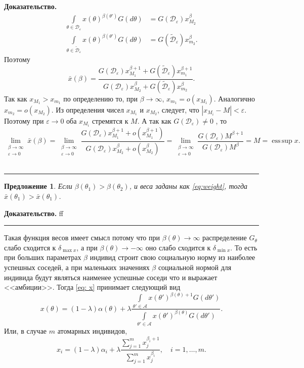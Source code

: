 \documentclass[12pt]{article}
\newtheorem{proposition}{Предложение}
\newenvironment{proof}[1][Доказательство]{\noindent\textbf{#1.} }{\ \rule{0.5em}{0.5em}}
\newcommand\abs[1]{\left\lvert#1\right\rvert}
\DeclareMathOperator*{\esssup}{ess\,sup}
\begin{document}
\begin{proof}
\begin{align*}
\int\limits_{\theta \in \mathcal{D}_\varepsilon}x(\theta)^{\beta(\theta')}G(d \theta) &= G(\mathcal{D}_\varepsilon) x_{M_2}^{\beta}  \\
\int\limits_{\theta \in \widetilde{\mathcal{D}}_\varepsilon}x(\theta)^{\beta(\theta')}G(d \theta) &= G(\widetilde{\mathcal{D}}_\varepsilon) x_{m_2}^{\beta}.
\end{align*}
Поэтому 
\begin{equation*}
\bar{x}(\beta) = \frac{G(\mathcal{D}_\varepsilon) x_{M_1}^{\beta + 1} + G(\widetilde{\mathcal{D}}_\varepsilon) x_{m_1}^{\beta+1}}{G(\mathcal{D}_\varepsilon) x_{M_2}^{\beta} + G(\widetilde{\mathcal{D}}_\varepsilon) x_{m_2}^{\beta}}.
\end{equation*}
Так как $x_{M_1} > x_{m_1}$ по определению то,  при $\beta \to \infty$,  $x_{m_1} = o(x_{M_1}). $ 
Аналогично $x_{m_2} = o(x_{M_2}). $ 
Из определения чисел $x_{M_1}$ и $x_{M_2}$,  следует,  что $\abs{x_{M_i} - M} < \varepsilon$.  Поэтому при $\varepsilon \to 0$ оба $x_{M_i}$ стремятся к $M$. 
А так как $G(\mathcal{D}_\varepsilon) \neq 0$ ,  то
\begin{equation*}
\lim\limits_{\substack{\beta \to \infty \\  \varepsilon \to 0}} \bar{x}(\beta) = 
\lim\limits_{\substack{\beta \to \infty \\  \varepsilon \to 0}} \frac{G(\mathcal{D}_\varepsilon) x_{M_1}^{\beta + 1} + o(x_{M_1}^{\beta+1})}{G(\mathcal{D}_\varepsilon) x_{M_2}^{\beta} + o(x_{M_2}^{\beta})} =
\lim\limits_{\substack{\beta \to \infty \\  \varepsilon \to 0}}  \frac{G(\mathcal{D}_\varepsilon)M^{\beta+1}}{G(\mathcal{D}_\varepsilon)M^{\beta}} = M = \esssup x.
\end{equation*}
\end{proof}

\begin{proposition}
Если $\beta(\theta_1) > \beta(\theta_2)$, и веса заданы как \eqref{eq:weight}, тогда $\bar{x}(\theta_1) > \bar{x}(\theta_1)$.
\end{proposition}
\begin{proof}
ff
\end{proof}

Такая функция весов имеет смысл потому что при $\beta(\theta) \rightarrow \infty$ распределение $G_\theta$ слабо сходится к $\delta_{\max x}$,  а при $\beta(\theta) \rightarrow -\infty$ оно слабо сходится к $\delta_{\min x}$.  
То есть при больших параметрах $\beta$ индивид строит свою социальную норму из наиболее успешных соседей,  а при маленьких значениях $\beta$ социальной нормой для индивида будут являться наименее успешные соседи что и выражает <<амбиции>>.
Тогда \eqref{eq: x} принимает следующий вид
$$
x(\theta) = (1-\lambda)\alpha(\theta) + \lambda \frac{\int\limits_{\theta' \in \mathcal{A}} x(\theta')^{\beta(\theta) + 1} G(d \theta')}{\int\limits_{\theta' \in \mathcal{A}} x(\theta')^{\beta(\theta)}G(d \theta')}.
$$
Или,  в случае $m$ атомарных индивидов,
$$
x_i = (1-\lambda) \alpha_i + \lambda \frac{\sum\limits_{j=1}^m x_j^{\beta_i+1}}{\sum\limits_{j=1}^m x_j^{\beta_i}}, \quad i = 1,\dots , m.
$$
\end{document}
